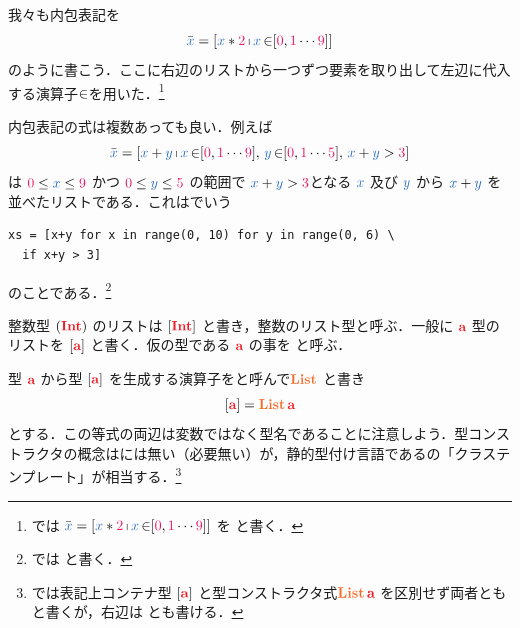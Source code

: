 \documentclass[a5paper,twoside,fleqn,draft]{jsbook}
\begin{document}
我々も内包表記を
\begin{equation}
  \hListVarWith{x}
  =\hListWith{\hVar{x}*\hConstant{2}\hListComprehension\hVar{x}\hFrom\hListWith{\hConstant{0},\hConstant{1}\dotsb\hConstant{9}}}
\end{equation}
のように書こう．ここに右辺のリストから一つずつ要素を取り出して左辺に代入する演算子$\operatorname{\in}$を用いた．\footnote{\haskell では $  \hListVarWith{x}=\hListWith{\hVar{x}*\hConstant{2}\hListComprehension\hVar{x}\hFrom\hListWith{\hConstant{0},\hConstant{1}\dotsb\hConstant{9}}}
$ を  と書く．}

内包表記の式は複数あっても良い．例えば
\begin{equation}
  \hListVarWith{x}
  =[\hVar{x}+\hVar{y}\mListComp\hVar{x}\mFrom[\hConstant{0},\hConstant{1}\dotsb\hConstant{9}],\,\hVar{y}\mFrom[\hConstant{0},\hConstant{1}\dotsb\hConstant{5}],\,\hVar{x}+\hVar{y}>\hConstant{3}]
\end{equation}
は $\hConstant{0}\le\hVar{x}\le\hConstant{9}$ かつ $\hConstant{0}\le\hVar{y}\le\hConstant{5}$ の範囲で $\hVar{x}+\hVar{y}>\hConstant{3}$となる $\hVar{x}$ 及び $\hVar{y}$ から $\hVar{x}+\hVar{y}$ を並べたリストである．これは\python でいう
\begin{pythoncode}
\begin{verbatim}
xs = [x+y for x in range(0, 10) for y in range(0, 6) \
  if x+y > 3]
\end{verbatim}
\end{pythoncode}
のことである．\footnote{\haskell では  と書く．}


整数型 $(\hInt)$ のリストは $\hListConstruct{\hInt}$ と書き，整数のリスト型と呼ぶ．一般に $\hTypeName{a}$ 型のリストを $\hListConstruct{\hTypeName{a}}$ と書く．仮の型である $\hTypeName{a}$ の事を と呼ぶ．

型 $\hTypeName{a}$ から型 $\hListConstruct{\hTypeName{a}}$ を生成する演算子をと呼んで$\hList$ と書き
\begin{equation}
  \hListConstruct{\hTypeName{a}}
  =\hList\,\hTypeName{a}
\end{equation}
とする．この等式の両辺は変数ではなく型名であることに注意しよう．型コンストラクタの概念は\python には無い（必要無い）が，静的型付け言語である\cxx の「クラステンプレート」が相当する．\footnote{\haskell では表記上コンテナ型 $\hListConstruct{\hTypeName{a}}$ と型コンストラクタ式$\hList\,\hTypeName{a}$ を区別せず両者とも \code{[a]} と書くが，右辺は  とも書ける．}
\end{document}
